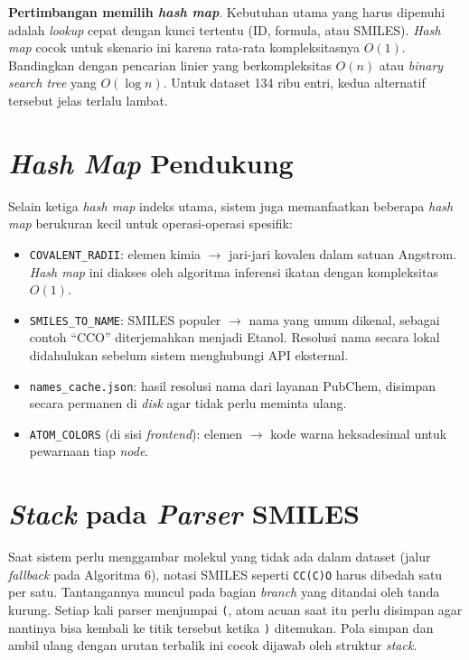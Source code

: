 \documentclass[a4paper,12pt]{report}
\begin{document}
\textbf{Pertimbangan memilih \textit{hash map}}. Kebutuhan utama yang harus dipenuhi adalah \textit{lookup} cepat dengan kunci tertentu (ID, formula, atau SMILES). \textit{Hash map} cocok untuk skenario ini karena rata-rata kompleksitasnya $O(1)$. Bandingkan dengan pencarian linier yang berkompleksitas $O(n)$ atau \textit{binary search tree} yang $O(\log n)$. Untuk dataset 134 ribu entri, kedua alternatif tersebut jelas terlalu lambat.

\section{\textit{Hash Map} Pendukung}

Selain ketiga \textit{hash map} indeks utama, sistem juga memanfaatkan beberapa \textit{hash map} berukuran kecil untuk operasi-operasi spesifik:

\begin{itemize}
    \item \texttt{COVALENT\_RADII}: elemen kimia $\to$ jari-jari kovalen dalam satuan Angstrom. \textit{Hash map} ini diakses oleh algoritma inferensi ikatan dengan kompleksitas $O(1)$.
    \item \texttt{SMILES\_TO\_NAME}: SMILES populer $\to$ nama yang umum dikenal, sebagai contoh ``CCO'' diterjemahkan menjadi Etanol. Resolusi nama secara lokal didahulukan sebelum sistem menghubungi API eksternal.
    \item \texttt{names\_cache.json}: hasil resolusi nama dari layanan PubChem, disimpan secara permanen di \textit{disk} agar tidak perlu meminta ulang.
    \item \texttt{ATOM\_COLORS} (di sisi \textit{frontend}): elemen $\to$ kode warna heksadesimal untuk pewarnaan tiap \textit{node}.
\end{itemize}

\section{\textit{Stack} pada \textit{Parser} SMILES}

Saat sistem perlu menggambar molekul yang tidak ada dalam dataset (jalur \textit{fallback} pada Algoritma 6), notasi SMILES seperti \texttt{CC(C)O} harus dibedah satu per satu. Tantangannya muncul pada bagian \textit{branch} yang ditandai oleh tanda kurung. Setiap kali parser menjumpai \texttt{(}, atom acuan saat itu perlu disimpan agar nantinya bisa kembali ke titik tersebut ketika \texttt{)} ditemukan. Pola simpan dan ambil ulang dengan urutan terbalik ini cocok dijawab oleh struktur \textit{stack}.
\end{document}
